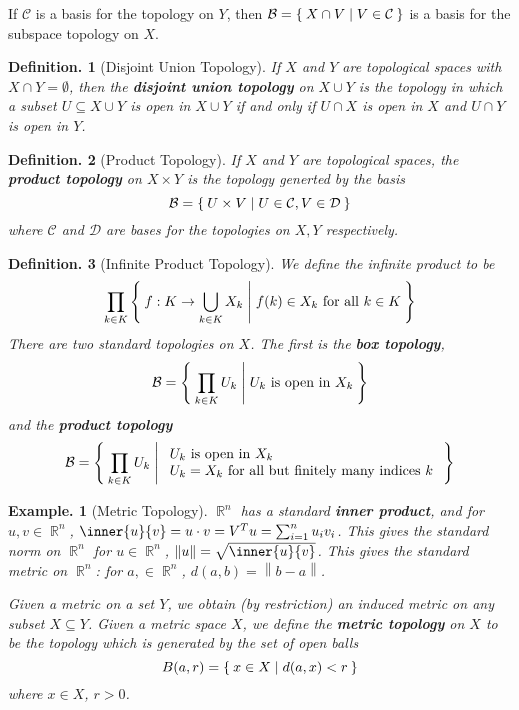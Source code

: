 \documentclass[11pt, a4paper]{memoir}
\DeclareMathOperator{\R}{{\mathbb{R}}}
\newcommand{\norm}[1]{\ensuremath{\left\lVert#1\right\rVert}}
\theoremstyle{change}
\theoremstyle{plain}
\theoremstyle{nonumberplain}
\newtheorem{definition}{Definition.}
\newtheorem{example}{Example.}
\numberwithin{equation}{section}
\begin{document}
If $\mathcal{C}$ is a basis for the topology on $Y$, then $\mathcal{B}=\Set{X\cap V | V\in\mathcal{C}}$ is a basis for the subspace topology on $X$.
\begin{definition}[Disjoint Union Topology]
    If $X$ and $Y$ are topological spaces with $X\cap Y=\emptyset$, then the \textbf{disjoint union topology} on $X\cup Y$ is the topology in which a subset $U\subseteq X\cup Y$ is open in $X\cup Y$ if and only if $U\cap X$ is open in $X$ and $U\cap Y$ is open in $Y$.
\end{definition}
\begin{definition}[Product Topology]
    If $X$ and $Y$ are topological spaces, the \textbf{product topology} on $X\times Y$ is the topology generted by the basis
    \begin{equation*}
        \mathcal{B}=\Set{U\times V | U\in\mathcal{C},V\in\mathcal{D}}
    \end{equation*}
    where $\mathcal{C}$ and $\mathcal{D}$ are bases for the topologies on $X,Y$ respectively.
\end{definition}
\begin{definition}[Infinite Product Topology]
    We define the infinite product to be
    \begin{equation*}
        \prod_{k\in K}\Set{f:K\to \bigcup_{k\in K}X_k | f(k)\in X_k\text{ for all }k\in K}
    \end{equation*}
    There are two standard topologies on $X$.
    The first is the \textbf{box topology},
    \begin{equation*}
        \mathcal{B}=\Set{\prod_{k\in K}U_k | U_k\text{ is open in }X_k}
    \end{equation*}
    and the \textbf{product topology}
    \begin{equation*}
        \mathcal{B}=\Set{\prod_{k\in K}U_k | \begin{array}{l}U_k\text{ is open in }X_k\\U_k=X_k\text{ for all but finitely many indices }k\end{array}}
    \end{equation*}
\end{definition}
\begin{example}[Metric Topology]
    $\R^n$ has a standard \textbf{inner product}, and for $u,v\in\R^n$, $\inner{u}{v}=u\cdot v=V^Tu=\sum_{i=1}^n u_iv_i$.
    This gives the standard norm on $\R^n$ for $u\in\R^n$, $\norm{u}=\sqrt{\inner{u}{v}}$.
    This gives the standard metric on $\R^n$: for $a,\in\R^n$, $d(a,b)=\norm{b-a}$.

    Given a metric on a set $Y$, we obtain (by restriction) an induced metric on any subset $X\subseteq Y$.
    Given a metric space $X$, we define the \textbf{metric topology} on $X$ to be the topology which is generated by the set of open balls
    \begin{equation*}
        B(a,r) = \Set{x\in X | d(a,x)<r}
    \end{equation*}
    where $x\in X$, $r>0$.
\end{example}
\end{document}
